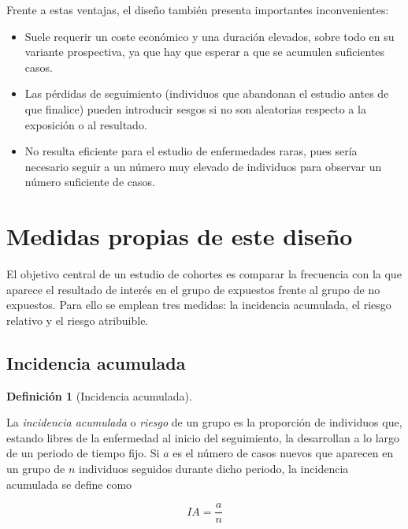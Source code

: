 \documentclass[
  spanish,
  a4paper,
]{scrreport}
\providecommand{\tightlist}{%
  \setlength{\itemsep}{0pt}\setlength{\parskip}{0pt}}
\theoremstyle{definition}
\theoremstyle{definition}
\newtheorem{definition}{Definición}[chapter]
\theoremstyle{remark}
\begin{document}
Frente a estas ventajas, el diseño también presenta importantes
inconvenientes:

\begin{itemize}
\tightlist
\item
  Suele requerir un coste económico y una duración elevados, sobre todo
  en su variante prospectiva, ya que hay que esperar a que se acumulen
  suficientes casos.
\item
  Las pérdidas de seguimiento (individuos que abandonan el estudio antes
  de que finalice) pueden introducir sesgos si no son aleatorias
  respecto a la exposición o al resultado.
\item
  No resulta eficiente para el estudio de enfermedades raras, pues sería
  necesario seguir a un número muy elevado de individuos para observar
  un número suficiente de casos.
\end{itemize}

\section{Medidas propias de este
diseño}\label{medidas-propias-de-este-diseuxf1o-2}

El objetivo central de un estudio de cohortes es comparar la frecuencia
con la que aparece el resultado de interés en el grupo de expuestos
frente al grupo de no expuestos. Para ello se emplean tres medidas: la
incidencia acumulada, el riesgo relativo y el riesgo atribuible.

\subsection{Incidencia acumulada}\label{incidencia-acumulada}

\begin{definition}[Incidencia
acumulada]\protect\hypertarget{def-cohortes-incidencia-acumulada}{}\label{def-cohortes-incidencia-acumulada}

La \emph{incidencia acumulada} o \emph{riesgo} de un grupo es la
proporción de individuos que, estando libres de la enfermedad al inicio
del seguimiento, la desarrollan a lo largo de un periodo de tiempo fijo.
Si \(a\) es el número de casos nuevos que aparecen en un grupo de \(n\)
individuos seguidos durante dicho periodo, la incidencia acumulada se
define como

\[IA = \frac{a}{n}\]

\end{definition}
\end{document}
